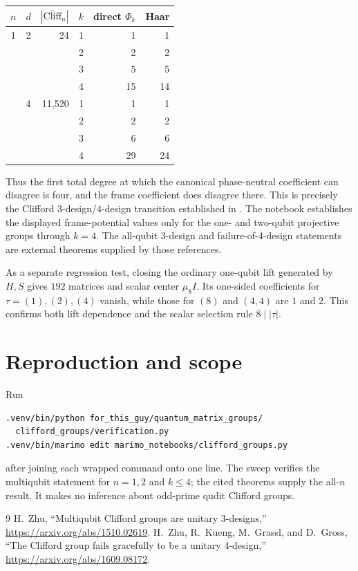 \documentclass[11pt]{article}
\begin{document}
\begin{center}
\begin{tabular}{@{}ccrrrr@{}}\toprule
$n$&$d$&$|\overline{\mathrm{Cliff}}_n|$&$k$&direct $\Phi_k$&Haar\\\midrule
1&2&24&1&1&1\\
 &&&2&2&2\\
 &&&3&5&5\\
 &&&4&15&14\\\addlinespace
2&4&11,520&1&1&1\\
 &&&2&2&2\\
 &&&3&6&6\\
 &&&4&29&24\\\bottomrule
\end{tabular}
\end{center}
Thus the first total degree at which the canonical phase-neutral coefficient
can disagree is four, and the frame coefficient does disagree there.
This is precisely the Clifford $3$-design/$4$-design transition established
in \cite{zhu3design,graceful}.
The notebook establishes the displayed frame-potential values only for the
one- and two-qubit projective groups through $k=4$.  The all-qubit 3-design
and failure-of-4-design statements are external theorems supplied by those
references.

As a separate regression test, closing the ordinary one-qubit lift generated
by $H,S$ gives $192$ matrices and scalar center $\mu_8I$.  Its one-sided
coefficients for $\tau=(1),(2),(4)$ vanish, while those for $(8)$ and $(4,4)$
are $1$ and $2$.  This confirms both lift dependence and the scalar selection
rule $8\mid|\tau|$.

\section{Reproduction and scope}
Run
\begin{verbatim}
.venv/bin/python for_this_guy/quantum_matrix_groups/
  clifford_groups/verification.py
.venv/bin/marimo edit marimo_notebooks/clifford_groups.py
\end{verbatim}
after joining each wrapped command onto one line.  The sweep verifies the
multiqubit statement for $n=1,2$ and $k\leq4$; the cited theorems supply the
all-$n$ result.  It makes no inference about odd-prime qudit Clifford groups.

\begin{thebibliography}{9}
 H.~Zhu, ``Multiqubit Clifford groups are unitary
3-designs,'' \url{https://arxiv.org/abs/1510.02619}.
 H.~Zhu, R.~Kueng, M.~Grassl, and D.~Gross,
``The Clifford group fails gracefully to be a unitary 4-design,''
\url{https://arxiv.org/abs/1609.08172}.
\end{thebibliography}
\end{document}
